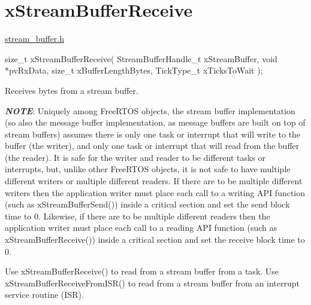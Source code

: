 \hypertarget{group__x_stream_buffer_receive}{}\section{x\+Stream\+Buffer\+Receive}
\label{group__x_stream_buffer_receive}
\mbox{\hyperlink{stream__buffer_8h_source}{stream\+\_\+buffer.\+h}}


\begin{DoxyPre}
size\_t xStreamBufferReceive( StreamBufferHandle\_t xStreamBuffer,
                             void *pvRxData,
                             size\_t xBufferLengthBytes,
                             TickType\_t xTicksToWait );
\end{DoxyPre}


Receives bytes from a stream buffer.

{\itshape {\bfseries{N\+O\+TE}}}\+: Uniquely among Free\+R\+T\+OS objects, the stream buffer implementation (so also the message buffer implementation, as message buffers are built on top of stream buffers) assumes there is only one task or interrupt that will write to the buffer (the writer), and only one task or interrupt that will read from the buffer (the reader). It is safe for the writer and reader to be different tasks or interrupts, but, unlike other Free\+R\+T\+OS objects, it is not safe to have multiple different writers or multiple different readers. If there are to be multiple different writers then the application writer must place each call to a writing A\+PI function (such as x\+Stream\+Buffer\+Send()) inside a critical section and set the send block time to 0. Likewise, if there are to be multiple different readers then the application writer must place each call to a reading A\+PI function (such as x\+Stream\+Buffer\+Receive()) inside a critical section and set the receive block time to 0.

Use x\+Stream\+Buffer\+Receive() to read from a stream buffer from a task. Use x\+Stream\+Buffer\+Receive\+From\+I\+S\+R() to read from a stream buffer from an interrupt service routine (I\+SR).


